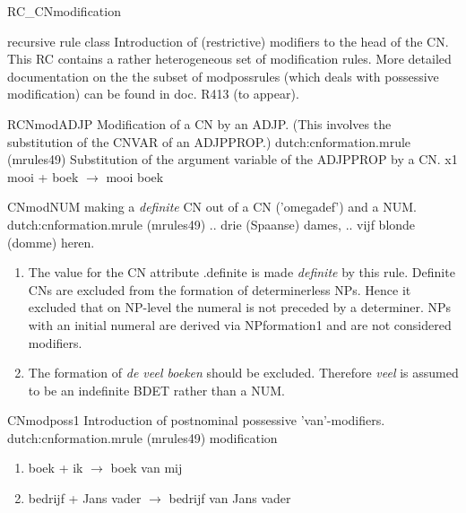 
\begin{mruleclass}{RC\_CNmodification}
\begin{classdescr}
\kind recursive rule class
\classtask Introduction of (restrictive) modifiers to the head of the CN.
\classremarks\mbox{}
This RC contains a rather heterogeneous set of modification rules. 
More detailed documentation on the the subset of modpossrules 
(which deals with possessive modification)
can be found in doc. R413 
(to appear).

\nofilters

\nospeedrules

\noplannedrules

\norulesnotince


\end{classdescr}

\begin{members}


\begin{member}
 RCNmodADJP
 Modification of a CN by an ADJP. (This involves the 
substitution  of the CNVAR of an ADJPPROP.)
\file dutch:cnformation.mrule (mrules49)
\semantics Substitution of the argument variable of the
ADJPPROP by a CN.
\example x1 mooi + boek $\rightarrow$ mooi boek
\remarks\mbox{} 
\end{member}
\begin{member}
 CNmodNUM
 making a {\em definite} CN out of a CN ('omegadef') and a NUM.
\file dutch:cnformation.mrule (mrules49)
\semantics \nosemantics
\example .. drie (Spaanse) dames, .. vijf blonde (domme) heren.
\remarks\mbox{}
\begin{enumerate}
  \item 
The value for the CN attribute .definite is made {\em definite} by 
this rule. Definite CNs are excluded from the formation of determinerless NPs.
Hence it excluded that on NP-level the numeral is not preceded by a determiner.
NPs with an initial numeral are derived via NPformation1 and are not
considered modifiers. 
  \item
The formation of  {\em *de veel boeken} should be excluded.
Therefore {\em veel} is assumed to be an indefinite BDET rather than a
NUM.
\end{enumerate}

\end{member}
\begin{member}
 CNmodposs1
Introduction of postnominal possessive 'van'-modifiers.
\file dutch:cnformation.mrule (mrules49)
\semantics modification
\example
\begin{enumerate}
  \item 
 boek + ik $\rightarrow$ boek van mij
  \item
 bedrijf  + Jans vader $\rightarrow$ bedrijf van Jans vader
\end{enumerate}
\remarks\mbox{}


\end{member}
\end{members}
\end{mruleclass}

